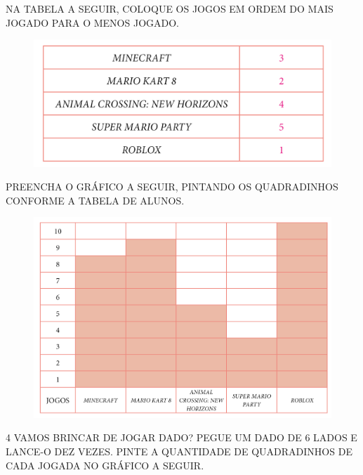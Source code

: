 \begin{escolha}
\item NA TABELA A SEGUIR, COLOQUE OS JOGOS EM ORDEM DO MAIS JOGADO PARA O MENOS JOGADO.

\begin{figure}[htpb!]
\centering
\includegraphics[width=.6\textwidth]{./media/SAEB_1ANO_MAT_FIGURA100.png}
\end{figure}

\pagebreak
\item PREENCHA O GRÁFICO A SEGUIR, PINTANDO OS QUADRADINHOS CONFORME A TABELA DE ALUNOS.

\begin{figure}[htpb!]
\centering
\includegraphics[width=.7\textwidth]{./media/SAEB_1ANO_MAT_FIGURA101.png}
\end{figure}
\end{escolha}


\pagebreak
\num{4} VAMOS BRINCAR DE JOGAR DADO? PEGUE UM DADO DE 6 LADOS E LANCE-O DEZ
VEZES. PINTE A QUANTIDADE DE QUADRADINHOS DE CADA JOGADA NO GRÁFICO
A SEGUIR.


